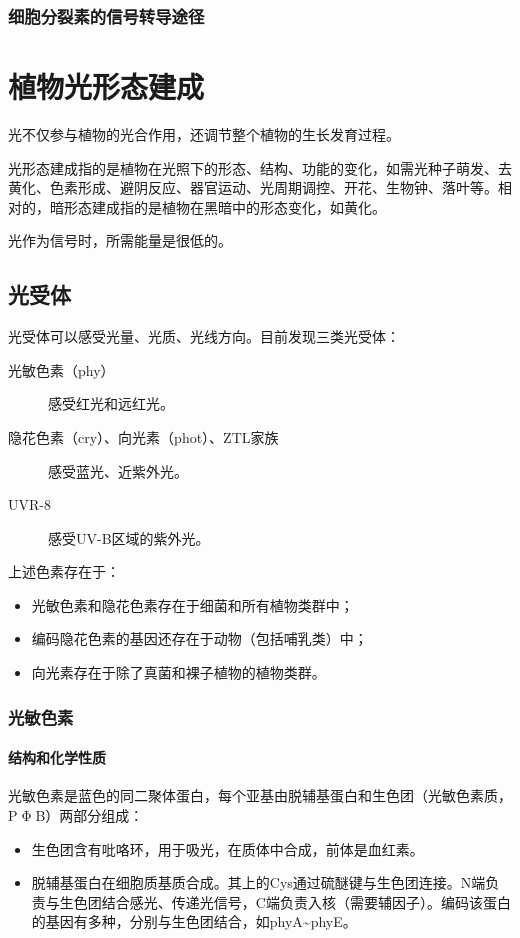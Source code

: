 \subsubsection{细胞分裂素的信号转导途径}




\section{植物光形态建成}

光不仅参与植物的光合作用，还调节整个植物的生长发育过程。

光形态建成指的是植物在光照下的形态、结构、功能的变化，如需光种子萌发、去黄化、色素形成、避阴反应、器官运动、光周期调控、开花、生物钟、落叶等。相对的，暗形态建成指的是植物在黑暗中的形态变化，如黄化。

光作为信号时，所需能量是很低的。

\subsection{光受体}

光受体可以感受光量、光质、光线方向。目前发现三类光受体：
\begin{description}
	\item[光敏色素（phy）] 感受红光和远红光。
	\item[隐花色素（cry）、向光素（phot）、ZTL家族] 感受蓝光、近紫外光。
	\item[UVR-8] 感受UV-B区域的紫外光。
\end{description}

上述色素存在于：

\begin{itemize}
	\item 光敏色素和隐花色素存在于细菌和所有植物类群中；
	\item 编码隐花色素的基因还存在于动物（包括哺乳类）中；
	\item 向光素存在于除了真菌和裸子植物的植物类群。
\end{itemize}

\subsubsection{光敏色素}

\paragraph{结构和化学性质}

光敏色素是蓝色的同二聚体蛋白，每个亚基由脱辅基蛋白和生色团（光敏色素质，P$\upPhi$B）两部分组成：
\begin{itemize}
	\item 生色团含有吡咯环，用于吸光，在质体中合成，前体是血红素。
	\item 脱辅基蛋白在细胞质基质合成。其上的Cys通过硫醚键与生色团连接。N端负责与生色团结合感光、传递光信号，C端负责入核（需要辅因子）。编码该蛋白的基因有多种，分别与生色团结合，如phyA\textasciitilde phyE。
\end{itemize}


